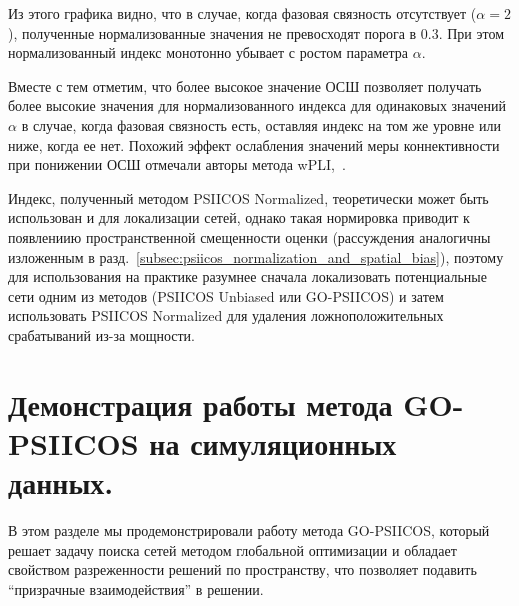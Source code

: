 Из этого графика видно, что в случае, когда фазовая связность отсутствует
($\alpha=2$), полученные нормализованные значения не превосходят порога в 0.3.
При этом нормализованный индекс монотонно убывает с ростом параметра $\alpha$.

Вместе с тем отметим, что более высокое значение ОСШ позволяет получать более
высокие значения для нормализованного индекса для одинаковых значений $\alpha$
в случае, когда фазовая связность есть, оставляя индекс на том же уровне или
ниже, когда ее нет. Похожий эффект ослабления значений меры коннективности при
понижении ОСШ отмечали авторы метода wPLI,~\cite{wPLI}.

Индекс, полученный методом PSIICOS Normalized, теоретически может быть
использован и для локализации сетей, однако такая нормировка приводит к
появлениию пространственной смещенности оценки (рассуждения аналогичны изложенным
в разд.~\ref{subsec:psiicos_normalization_and_spatial_bias}), поэтому для
использования на практике разумнее сначала локализовать потенциальные сети
одним из методов (PSIICOS Unbiased или GO-PSIICOS) и затем использовать
PSIICOS Normalized для удаления ложноположительных срабатываний из-за мощности.

\section{Демонстрация работы метода GO-PSIICOS на симуляционных данных.}

В этом разделе мы продемонстрировали работу метода GO-PSIICOS, который решает
задачу поиска сетей методом глобальной оптимизации и обладает свойством разреженности
решений по пространству, что позволяет подавить ``призрачные взаимодействия'' в
решении.


